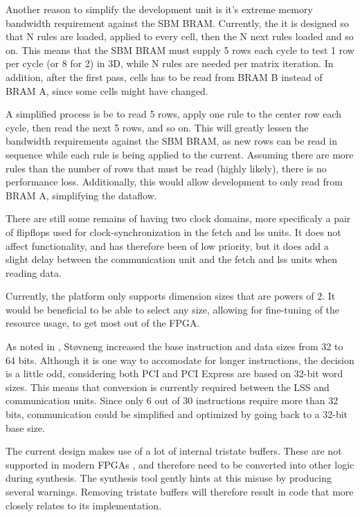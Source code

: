 Another reason to simplify the development unit is it's extreme memory bandwidth requirement against the SBM BRAM.
Currently, the it is designed so that N rules are loaded, applied to every cell, then the N next rules loaded and so on.
This means that the SBM BRAM must supply 5 rows each cycle to test 1 row per cycle (or 8 for 2) in 3D, while N rules are needed per matrix iteration.
In addition, after the first pass, cells has to be read from BRAM B instead of BRAM A, since some cells might have changed.

A simplified process is be to read 5 rows, apply one rule to the center row each cycle, then read the next 5 rows, and so on.
This will greatly lessen the bandwidth requirements against the SBM BRAM, as new rows can be read in sequence while each rule is being applied to the current.
Assuming there are more rules than the number of rows that must be read (highly likely), there is no performance loss.
Additionally, this would allow development to only read from BRAM A, simplifying the dataflow.

There are still some remains of having two clock domains, more specificaly a pair of flipflops used for clock-synchronization in the fetch and lss units.
It does not affect functionality, and has therefore been of low priority, but it does add a slight delay between the communication unit and the fetch and lss units when reading data.

Currently, the platform only supports dimension sizes that are powers of 2.
It would be beneficial to be able to select any size, allowing for fine-tuning of the resource usage, to get most out of the FPGA.

As noted in \cite{stovneng2014sblock}, Støvneng increased the base instruction and data sizes from 32 to 64 bits.
Although it is one way to accomodate for longer instructions, the decision is a little odd, considering both PCI and PCI Express are based on 32-bit word sizes.
This means that conversion is currently required between the LSS and communication units.
Since only 6 out of 30 instructions require more than 32 bits, communication could be simplified and optimized by going back to a 32-bit base size.

The current design makes use of a lot of internal tristate buffers.
These are not supported in modern FPGAs \cite{koch2008buses}, and therefore need to be converted into other logic during synthesis.
The synthesis tool gently hints at this misuse by producing several warnings.
Removing tristate buffers will therefore result in code that more closely relates to its implementation.

